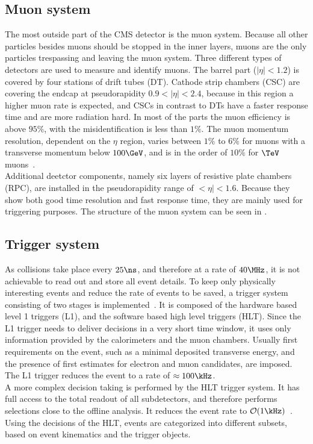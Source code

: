 \subsection{Muon system}
The most outside part of the CMS detector is the muon system. Because all other particles besides muons should be stopped in the inner layers, muons are the only particles trespassing and leaving the muon system. Three different types of detectors are used to measure and identify muons. The barrel part ($|\eta|<1.2$) is covered by four stations of drift tubes (DT). Cathode strip chambers (CSC) are covering the endcap at pseudorapidity $0.9<|\eta|<2.4$, because in this region a higher muon rate is expected, and CSCs in contrast to DTs have a faster response time and are more radiation hard. In most of the parts the muon efficiency is above $95\%$, with the misidentification is less than $1\%$. The muon momentum resolution, dependent on the $\eta$ region, varies between $1\%$ to $6\%$ for muons with a transverse momentum below $100\GeV$, and is in the order of $10\%$ for $\TeV$ muons~\cite{MuonPerformance}.\\
Additional deetctor components, namely six layers of resistive plate chambers (RPC), are installed in the pseudorapidity range of $<\eta|<1.6$. Because they show both good time resolution and fast response time, they are mainly used for triggering purposes. The structure of the muon system can be seen in .

\subsection{Trigger system}
As collisions take place every $25\ns$, and therefore at a rate of $40\MHz$, it is not achievable to read out and store all event details. To keep only physically interesting events and reduce the rate of events to be saved, a trigger system consisting of two stages is implemented~\cite{TriggerSystem}. It is composed of the hardware based level 1 triggers (L1), and the software based high level triggers (HLT). Since the L1 trigger needs to deliver decisions in a very short time window, it uses only information provided by the calorimeters and the muon chambers. Usually first requirements on the event, such as a minimal deposited transverse energy, and  the presence of first estimates for electron and muon candidates, are imposed. The L1 trigger reduces the event to a rate of $\approx100\kHz$.\\
A more complex decision taking is performed by the HLT trigger system. It has full access to the total readout of all subdetectors, and therefore performs selections close to the offline analysis. It reduces the event rate to $\mathcal{O}(1\kHz)$~\cite{TriggerRate}.\\
Using the decisions of the HLT, events are categorized into different subsets, based on event kinematics and the trigger objects.
